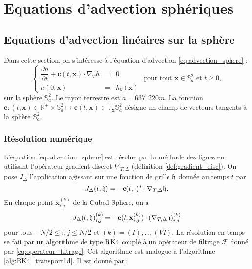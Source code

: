 
\chapter{Equations d'advection sphériques}
\label{chap:advection}

\section{Equations d'advection linéaires sur la sphère}

Dans cette section, on s'intéresse à l'équation d'advection \eqref{eq:advection_sphere} :
\begin{equation}
\left\lbrace
\begin{array}{rcl}
\dfrac{\partial h}{\partial t} + \mathbf{c}(t,\mathbf{x}) \cdot \nabla_T h & = & 0 \\
h(0,\mathbf{x}) & = & h_0(\mathbf{x})
\end{array}
\right. \text{ pour tout } \mathbf{x} \in \mathbb{S}_a^2 \text{ et } t \geq 0,
\label{eq:advection_sphere}
\end{equation}
sur la sphère $\mathbb{S}_a^2$. Le rayon terrestre est $a = 6 371 220 \si{m}$.
La fonction $\mathbf{c} : (t,\mathbf{x}) \in \mathbb{R}^+ \times \mathbb{S}_a^2 \mapsto \mathbf{c}(t,\mathbf{x}) \in \mathbb{T}_{\mathbf{x}} \mathbb{S}_a^2$ désigne un champ de vecteurs tangents à la sphère $\mathbb{S}_a^2$.

\subsection{Résolution numérique}

L'équation \eqref{eq:advection_sphere} est résolue par la méthode des lignes en utilisant l'opérateur gradient discret $\nabla_{T,\Delta}$ (définition \ref{def:gradient_disc}). On pose $J_{\Delta}$ l'application agissant sur une fonction de grille $\mathfrak{h}$ donnée au temps $t$ par
\begin{equation}
J_{\Delta}(t, \mathfrak{h}) = - \mathbf{c}(t,\cdot)^* \cdot \nabla_{T,\Delta} \mathfrak{h}.
\end{equation}
En chaque point $\mathbf{x}_{i,j}^{(k)}$ de la Cubed-Sphere, on a
\begin{equation}
J_{\Delta}(t, \mathfrak{h})_{i,j}^{(k)} = - \mathbf{c}(t,\mathbf{x}_{i,j}^{(k)}) \cdot \left(\nabla_{T,\Delta} \mathfrak{h}\right)_{i,j}^{(k)}
\end{equation}
pour tous $-N/2 \leq i,j \leq N/2$ et $(k) = (I), ..., (VI)$.
La résolution en temps se fait par un algorithme de type $\RK4$ couplé à un opérateur de filtrage $\mathcal{F}$ donné par \eqref{eq:operateur_filtrage}. Cet algorithme est analogue à l'algorithme \ref{alg:RK4_transport1d}. Il est donné par :

